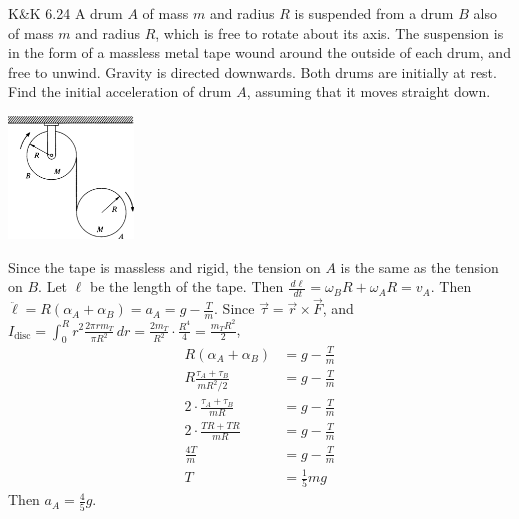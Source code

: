 \documentclass{esg8012pset}
\renewcommand{\d}{\,d}
\begin{document}
\begin{problem}{K\&K 6.24}
  A drum $A$ of mass $m$ and radius $R$ is suspended from a drum $B$ also of mass $m$ and radius $R$, which is free to rotate about its axis. The suspension is in the form of a massless metal tape wound around the outside of each drum, and free to unwind. Gravity is directed downwards. Both drums are initially at rest. Find the initial acceleration of drum $A$, assuming that it moves straight down.
  \begin{center}\includegraphics[width=0.25\textwidth]{ps09_3}\end{center}
\end{problem}
\begin{solution}

  Since the tape is massless and rigid, the tension on $A$ is the same as the tension on $B$.  Let $\ell$ be the length of the tape.  Then $\frac{\d \ell}{\d t} = \omega_B R + \omega_A R = v_A$.  Then $\ddot \ell = R (\alpha_A + \alpha_B) = a_A = g - \frac{T}{m}$.  Since $\vec \tau = \vec r \times \vec F$, and $I_{\text{disc}} = \int_0^R r^2 \frac{2\pi r m_T}{\pi R^2} \d r = \frac{2 m_T}{R^2} \cdot \frac{R^4}{4} = \frac{m_T R^2}{2}$, \begin{align*}
  R (\alpha_A + \alpha_B) & = g - \frac{T}{m} \\
  R \frac{\tau_A + \tau_B}{m R^2 / 2} & = g - \frac{T}{m} \\
  2\cdot \frac{\tau_A + \tau_B}{m R} & = g - \frac{T}{m} \\
  2\cdot \frac{T R + T R}{m R} & = g - \frac{T}{m} \\
  \frac{4T}{m} & = g - \frac{T}{m} \\
  T & = \frac{1}{5}m g
  \end{align*}  Then $a_A = \frac{4}{5}g$.
\end{solution}
\end{document}
